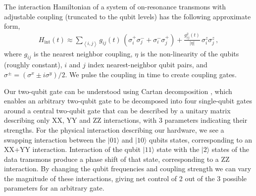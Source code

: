 The interaction Hamiltonian of a system of on-resonance transmons with adjustable coupling (truncated to the qubit levels) has the following approximate form,
\begin{align}
H_{\mathrm{int}}(t) \approx 
\sum_{\left< i,j \right>} g_{ij}(t) \, 
(\sigma_i^+ \sigma_j^- + \sigma_i^- \sigma_j^+) +
\frac{g_{ij}^2(t)}{|\eta |}\, \sigma_i^z \sigma_j^z \, ,
\end{align}
where $g_{ij}$ is the nearest neighbor coupling, $\eta$ is the non-linearity of the qubits (roughly constant),  $i$ and $j$ index nearest-neighbor qubit pairs, and $\sigma^{\pm} = (\sigma^x \pm i \sigma^y)/2$.  We pulse the coupling in time to create coupling gates.

Our two-qubit gate can be understood using Cartan decomposition \cite{tucci507171cartan}, which enables an arbitrary two-qubit gate to be decomposed into four single-qubit gates around a central two-qubit gate that can be described by a unitary matrix describing only XX, YY and ZZ interactions, with 3 parameters indicating their strengths.  For the physical interaction describing our hardware, we see a swapping interaction between the $|01\rangle$ and $|10\rangle$ qubits states, corresponding to an XX+YY interaction.  Interaction of the qubit $|11\rangle$ state with the $|2\rangle$ states of the data transmons produce a phase shift of that state, corresponding to a ZZ interaction.  By changing the qubit frequencies and coupling strength we can vary the magnitude of these interactions, giving net control of 2 out of the 3 possible parameters for an arbitrary gate.  
